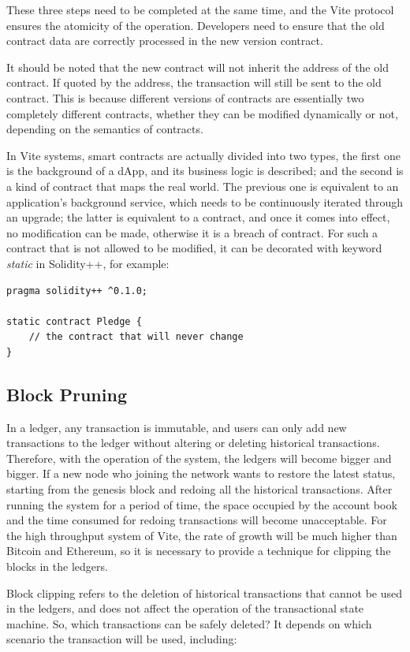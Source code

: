 \documentclass[UTF8,nofonts]{article}
\begin{document}
\begin{multicols}{2}
These three steps need to be completed at the same time, and the Vite protocol ensures the atomicity of the operation. Developers need to ensure that the old contract data are correctly processed in the new version contract.

It should be noted that the new contract will not inherit the address of the old contract. If quoted by the address, the transaction will still be sent to the old contract. This is because different versions of contracts are essentially two completely different contracts, whether they can be modified dynamically or not, depending on the semantics of contracts.

In Vite systems, smart contracts are actually divided into two types, the first one is the background of a dApp, and its business logic is described; and the second is a kind of contract that maps the real world. The previous one is equivalent to an application's background service, which needs to be continuously iterated through an upgrade; the latter is equivalent to a contract, and once it comes into effect, no modification can be made, otherwise it is a breach of contract. For such a contract that is not allowed to be modified, it can be decorated with keyword \textit{static} in Solidity++, for example:

\begin{verbatim}
pragma solidity++ ^0.1.0;

static contract Pledge {
    // the contract that will never change
}
\end{verbatim}

\subsection{Block Pruning}
In a ledger, any transaction is immutable, and users can only add new transactions to the ledger without altering or deleting historical transactions. Therefore, with the operation of the system, the ledgers will become bigger and bigger. If a new node who joining the network wants to restore the latest status, starting from the genesis block and redoing all the historical transactions. After running the system for a period of time, the space occupied by the account book and the time consumed for redoing transactions will become unacceptable. For the high throughput system of Vite, the rate of growth will be much higher than Bitcoin and Ethereum, so it is necessary to provide a technique for clipping the blocks in the ledgers.

Block clipping refers to the deletion of historical transactions that cannot be used in the ledgers, and does not affect the operation of the transactional state machine. So, which transactions can be safely deleted? It depends on which scenario the transaction will be used, including:



\end{multicols}
\end{document}
